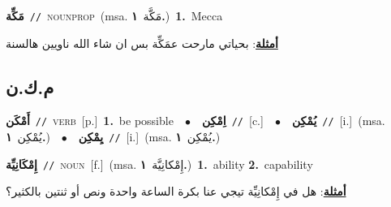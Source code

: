 \documentclass[10pt,a4paper,twoside]{article} %
\begin{document}
\begin{multicols}{2}
{\setlength\topsep{0pt}\textbf{\foreignlanguage{arabic}{مَكِّة}}\ {\color{gray}\texttt{//}\color{black}}\ \textsc{noun\textunderscore prop}\ \color{gray}(msa. \foreignlanguage{arabic}{مَكَّة}~\foreignlanguage{arabic}{\textbf{١.}})\color{black}\ \textbf{1.}~Mecca\  \begin{flushright}\color{gray}\foreignlanguage{arabic}{\textbf{\underline{\foreignlanguage{arabic}{أمثلة}}}: بحياتي مارحت عمَكِّة بس ان شاء الله ناويين هالسنة}\end{flushright}\color{black}} \vspace{2mm}

\vspace{-3mm}
\subsection*{\color{blue}\foreignlanguage{arabic}{م.ك.ن}\color{blue}{}} 

{\setlength\topsep{0pt}\textbf{\foreignlanguage{arabic}{أَمْكَن}}\ {\color{gray}\texttt{//}\color{black}}\ \textsc{verb}\ [p.]\ \textbf{1.}~be possible\ \ $\bullet$\ \ \setlength\topsep{0pt}\textbf{\foreignlanguage{arabic}{اِمْكِن}}\ {\color{gray}\texttt{//}\color{black}}\ [c.]\ \ $\bullet$\ \ \setlength\topsep{0pt}\textbf{\foreignlanguage{arabic}{يُمْكِن}}\ {\color{gray}\texttt{//}\color{black}}\ [i.]\ \color{gray}(msa. \foreignlanguage{arabic}{يُمْكِن}~\foreignlanguage{arabic}{\textbf{١.}})\color{black}\ \ $\bullet$\ \ \setlength\topsep{0pt}\textbf{\foreignlanguage{arabic}{يِمْكِن}}\ {\color{gray}\texttt{//}\color{black}}\ [i.]\ \color{gray}(msa. \foreignlanguage{arabic}{يُمْكِن}~\foreignlanguage{arabic}{\textbf{١.}})\color{black}\ } \vspace{2mm}

{\setlength\topsep{0pt}\textbf{\foreignlanguage{arabic}{إِمْكَانِيِّة}}\ {\color{gray}\texttt{//}\color{black}}\ \textsc{noun}\ [f.]\ \color{gray}(msa. \foreignlanguage{arabic}{إِمْكانِيَّة}~\foreignlanguage{arabic}{\textbf{١.}})\color{black}\ \textbf{1.}~ability  \textbf{2.}~capability\  \begin{flushright}\color{gray}\foreignlanguage{arabic}{\textbf{\underline{\foreignlanguage{arabic}{أمثلة}}}: هل في إِمْكانِيِّة تيجي عنا بكرة الساعة واحدة ونص أو ثنتين بالكثير؟}\end{flushright}\color{black}} \vspace{2mm}


\end{multicols}
\end{document}
